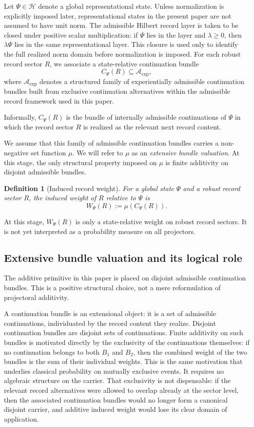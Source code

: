 \documentclass[11pt]{article}
\newtheorem{definition}{Definition}
\theoremstyle{remark}
\numberwithin{equation}{section}
\newcommand{\HH}{\mathcal{H}}
\newcommand{\Aexp}{\mathcal{A}_{\mathrm{exp}}}
\newcommand{\Cpsi}[1]{C_{\Psi}\!\left(#1\right)}
\newcommand{\Wpsi}[1]{W_{\Psi}\!\left(#1\right)}
\begin{document}
Let $\Psi \in \HH$ denote a global representational state. Unless normalization is explicitly imposed later, representational states in the present paper are not assumed to have unit norm. The admissible Hilbert record layer is taken to be closed under positive scalar multiplication: if $\Psi$ lies in the layer and $\lambda \ge 0$, then $\lambda \Psi$ lies in the same representational layer. This closure is used only to identify the full realized norm domain before normalization is imposed. For each robust record sector $R$, we associate a state-relative continuation bundle
\[
\Cpsi{R} \subseteq \Aexp,
\]
where $\Aexp$ denotes a structured family of experientially admissible continuation bundles built from exclusive continuation alternatives within the admissible record framework used in this paper.

Informally, $\Cpsi{R}$ is the bundle of internally admissible continuations of $\Psi$ in which the record sector $R$ is realized as the relevant next record content.

We assume that this family of admissible continuation bundles carries a non-negative set function $\mu$. We will refer to $\mu$ as an \emph{extensive bundle valuation}. At this stage, the only structural property imposed on $\mu$ is finite additivity on disjoint admissible bundles.

\begin{definition}[Induced record weight]
For a global state $\Psi$ and a robust record sector $R$, the induced weight of $R$ relative to $\Psi$ is
\[
\Wpsi{R} := \mu\!\left(\Cpsi{R}\right).
\]
\end{definition}

At this stage, $\Wpsi{R}$ is only a state-relative weight on robust record sectors. It is not yet interpreted as a probability measure on all projectors.

\subsection{Extensive bundle valuation and its logical role}

The additive primitive in this paper is placed on disjoint admissible
continuation bundles. This is a positive structural choice, not a
mere reformulation of projectoral additivity.

A continuation bundle is an extensional object: it is a set of
admissible continuations, individuated by the record content they
realize. Disjoint continuation bundles are disjoint sets of
continuations. Finite additivity on such bundles is motivated directly
by the exclusivity of the continuations themselves: if no continuation
belongs to both $B_1$ and $B_2$, then the combined weight of the
two bundles is the sum of their individual weights. This is the same
motivation that underlies classical probability on mutually exclusive
events. It requires no algebraic structure on the carrier. That
exclusivity is not dispensable: if the relevant record alternatives
were allowed to overlap already at the sector level, then the
associated continuation bundles would no longer form a canonical
disjoint carrier, and additive induced weight would lose its clear
domain of application.
\end{document}
